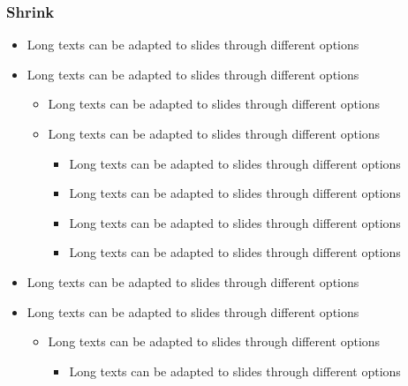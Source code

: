 \documentclass[usepdftitle=false,professionalfonts,compress ]{beamer}
\begin{document}
{
\begin{frame}\frametitle{Shrink}


	\begin{itemize}

	\item Long texts can be adapted to slides through different options

			\item Long texts can be adapted to slides through different options


	\begin{itemize}

	\item Long texts can be adapted to slides through different options

			\item Long texts can be adapted to slides through different options


	\begin{itemize}

	\item Long texts can be adapted to slides through different options

			\item Long texts can be adapted to slides through different options

			\item Long texts can be adapted to slides through different options

			\item Long texts can be adapted to slides through different options

				\end{itemize}

				\end{itemize}

			\item Long texts can be adapted to slides through different options

			\item Long texts can be adapted to slides through different options


	\begin{itemize}

	\item Long texts can be adapted to slides through different options


	\begin{itemize}

	\item Long texts can be adapted to slides through different options


\end{itemize}
\end{itemize}
\end{itemize}
\end{frame}}
\end{document}
